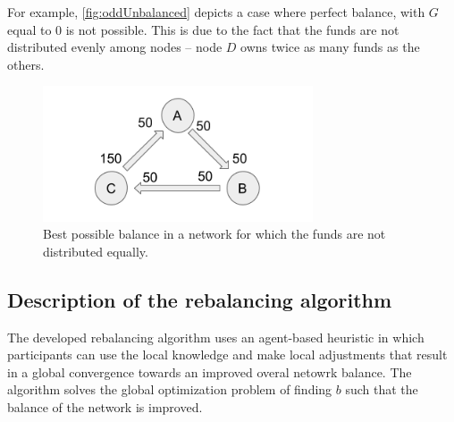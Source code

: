 \documentclass[a4paper]{paper}
\begin{document}
For example, \cref{fig:oddUnbalanced} depicts a case where perfect balance, with $G$ equal to $0$  is not possible. 
This is due to the fact that the funds are not distributed evenly among nodes -- node $D$ owns twice as many funds as the others.

\begin{figure}
 \centering
 \includegraphics[width=8cm]{img/oddBalanced.png}
 \caption{Best possible balance in a network for which the funds are not distributed equally.}
 \label{fig:oddBalanced}
\end{figure}



\subsection{Description of the rebalancing algorithm}
\label{sec:Algorithm}

The developed rebalancing algorithm uses an agent-based heuristic in which participants can use the local knowledge and make local adjustments that result in a global convergence towards an improved overal netowrk balance. 
The algorithm solves the global optimization problem of finding $b$ such that the balance of the network is improved.
\end{document}
